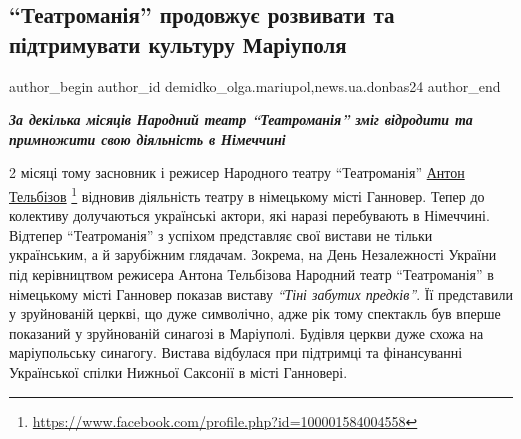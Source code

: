  
 
 
 
 
 
\subsection{\enquote{Театроманія} продовжує розвивати та підтримувати культуру Маріуполя}
\label{sec:06_09_2022.stz.news.ua.donbas24.1.teatromania_prodovzhue_rozv_pidtrym_kulturu_mrpl}
 
\ifcmt
 author_begin
   author_id demidko_olga.mariupol,news.ua.donbas24
 author_end
\fi


\begin{center}
  \em\color{blue}\bfseries\Large
За декілька місяців Народний театр \enquote{Театроманія} зміг відродити та
примножити свою діяльність в Німеччині
\end{center}

2 місяці тому засновник і режисер Народного театру \enquote{Театроманія} \href{https://www.facebook.com/profile.php?id=100001584004558}{%
Антон Тельбізов}%
\footnote{\url{https://www.facebook.com/profile.php?id=100001584004558}} відновив діяльність театру в німецькому місті Ганновер. Тепер до
колективу долучаються українські актори, які наразі перебувають в Німеччині.
Відтепер \enquote{Театроманія} з успіхом представляє свої вистави не тільки
українським, а й зарубіжним глядачам. Зокрема, на День Незалежності України під
керівництвом режисера Антона Тельбізова Народний театр \enquote{Театроманія} в
німецькому місті Ганновер показав виставу \emph{\enquote{Тіні забутих предків}}. Її
представили у зруйнованій церкві, що дуже символічно, адже рік тому спектакль
був вперше показаний у зруйнованій синагозі в Маріуполі. Будівля церкви дуже
схожа на маріупольську синагогу. Вистава відбулася при підтримці та
фінансуванні Української спілки Нижньої Саксонії в місті Ганновері.

